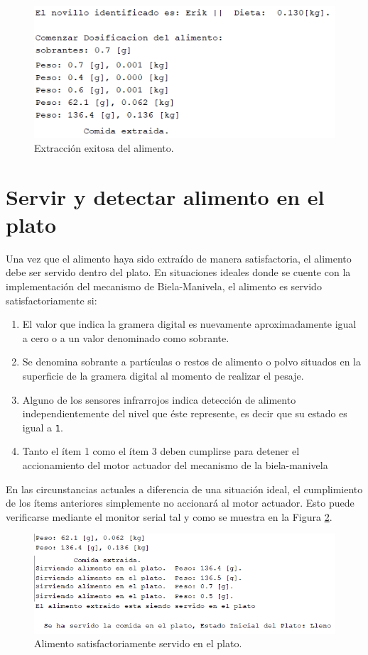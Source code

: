 \begin{figure}[H]
    \centering
    \includegraphics[scale=0.70]{img/extractok.png}
    \caption{Extracción exitosa del alimento.}
    \label{extractokpng}
\end{figure}

\section{Servir y detectar alimento en el plato}

Una vez que el alimento haya sido extraído de manera satisfactoria, el alimento debe ser servido dentro del plato. 
En situaciones ideales donde se cuente con la implementación del mecanismo de Biela-Manivela, el alimento es servido satisfactoriamente si:
\begin{enumerate}
    \item El valor que indica la gramera digital es nuevamente aproximadamente igual a cero o a un valor denominado como sobrante.
    \item Se denomina sobrante a partículas o restos de alimento o polvo situados en la superficie de la gramera digital al momento de realizar el pesaje.
    \item Alguno de los sensores infrarrojos indica detección de alimento independientemente del nivel que éste represente, es decir que su estado es igual a \texttt{1}.
    \item Tanto el ítem 1 como el ítem 3 deben cumplirse para detener el accionamiento del motor actuador del mecanismo de la biela-manivela
\end{enumerate}

En las circunstancias actuales a diferencia de una situación ideal, el cumplimiento de los ítems anteriores simplemente no accionará al motor actuador. Esto puede verificarse mediante el monitor serial tal y como se muestra en la Figura \ref{servedokpng}.

\begin{figure}[H]
    \centering
    \includegraphics[scale=0.7]{img/servedok.png}
    \caption{Alimento satisfactoriamente servido en el plato.}
    \label{servedokpng}
\end{figure}

